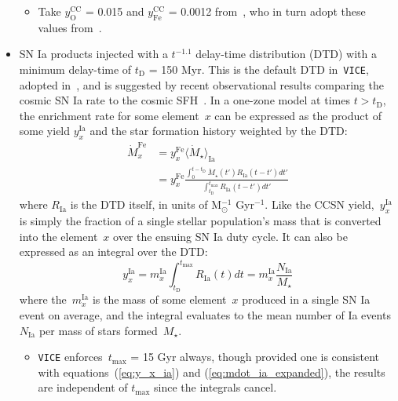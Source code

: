 \documentclass[fleqn, usenatbib]{mnras}
\newcommand{\ddfrac}[2]{\frac{\displaystyle #1}{\displaystyle #2}}
\newcommand{\refp}[1]{(\ref{#1})}
\begin{document}
\begin{itemize}
\begin{itemize}
		\item Take $y_\text{O}^\text{CC}$ = 0.015 and $y_\text{Fe}^\text{CC}$ 
		= 0.0012 from~\citet{Johnson2020}, who in turn adopt these values 
		from~\citet{Weinberg2017}. 
	\end{itemize} 

	\item SN Ia products injected with a $t^{-1.1}$ delay-time distribution 
	(DTD) with a minimum delay-time of $t_\text{D}$ = 150 Myr. This is the 
	default DTD in~\texttt{VICE}, adopted in~\citet{Johnson2020}, and is 
	suggested by recent observational results comparing the cosmic SN Ia rate 
	to the cosmic SFH~\citep{Maoz2012, Maoz2017}. In a 
	one-zone model at times $t > t_\text{D}$, the enrichment rate for some 
	element~$x$ can be expressed as the product of some yield $y_x^\text{Ia}$ 
	and the star formation history weighted by the DTD: 
	\begin{subequations}\begin{align} 
	\dot{M}_x^\text{Fe} &= y_x^\text{Fe}\langle\dot{M}_\star\rangle_\text{Ia} 
	\label{eq:mdot_ia} 
	\\ 
	&= y_x^\text{Fe} \ddfrac{
		\int_0^{t - t_\text{D}} \dot{M}_\star(t') R_\text{Ia}(t - t') dt' 
	}{
		\int_{t_\text{D}}^{t_\text{max}} R_\text{Ia}(t - t') dt' 
	} 
	\label{eq:mdot_ia_expanded} 
	\end{align}\end{subequations} 
	where $R_\text{Ia}$ is the DTD itself, in units of M$_\odot^{-1}$ 
	Gyr$^{-1}$. Like the CCSN yield,~$y_x^\text{Ia}$ is simply the fraction of 
	a single stellar population's mass that is converted into the element~$x$ 
	over the ensuing SN Ia duty cycle. It can also be expressed as an integral 
	over the DTD: 
	\begin{equation} 
	y_x^\text{Ia} = m_x^\text{Ia} \int_{t_\text{D}}^{t_\text{max}} 
		R_\text{Ia}(t) dt = m_x^\text{Ia} \frac{N_\text{Ia}}{M_\star} 
	\label{eq:y_x_ia} 
	\end{equation} 
	where the~$m_x^\text{Ia}$ is the mass of some element~$x$ produced in a 
	single SN Ia event on average, and the integral evaluates to the mean 
	number of Ia events~$N_\text{Ia}$ per mass of stars formed~$M_\star$. 
	\begin{itemize} 
		\item \texttt{VICE} enforces~$t_\text{max}$ = 15 Gyr always, though 
		provided one is consistent with equations~\refp{eq:y_x_ia} and 
		\refp{eq:mdot_ia_expanded}, the results are independent of 
		$t_\text{max}$ since the integrals cancel. 


\end{itemize}
\end{itemize}
\end{document}
